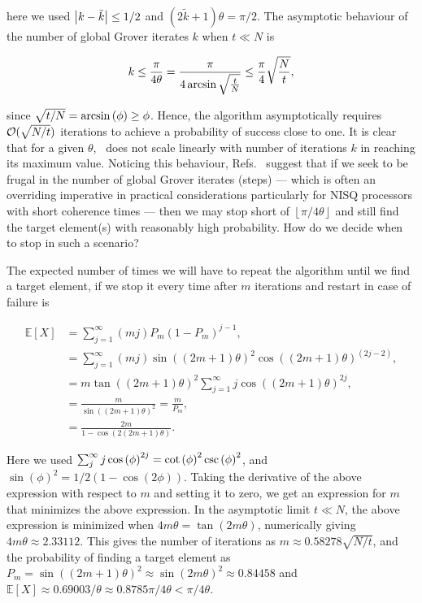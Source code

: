 \noindent
here we used $\abs{k - \tilde{k}} \leq 1/2$ and $(2\tilde{k} + 1)\theta = \pi/2$. The asymptotic behaviour of the number of global Grover iterates $k$ when $t \ll N$ is 

\begin{align}
	k \leq \frac{\pi}{4\theta} = \frac{\pi}{4\arcsine{\sqrt{\frac{t}{N}}}} \leq \frac{\pi}{4}\sqrt{\frac{N}{t}},
\end{align}

\noindent
since $\sqrt{t/N} = \arcsine{(\phi)} \geq \phi$. Hence, the algorithm asymptotically requires $\mathcal{O}(\sqrt{N/t})$ iterations to achieve a probability of success close to one. It is clear that for a given $\theta$,~ does not scale linearly with number of iterations $k$ in reaching its maximum value. Noticing this behaviour, Refs.~\cite{Boyer_1998,Gingrich_2000} suggest that if we seek to be frugal in the number of global Grover iterates (steps) --- which is often an overriding imperative in practical considerations particularly for \acs{NISQ} processors with short coherence times --- then we may stop short of $\left\lfloor \pi/4\theta \right\rfloor$ and still find the target element(s) with reasonably high probability. How do we decide when to stop in such a scenario? 

\clearpage
\noindent
The expected number of times we will have to repeat the algorithm until we find a target element, if we stop it every time after $m$ iterations and restart in case of failure is

\begin{align}
	\mathbb{E}[X] &= \displaystyle\sum_{j=1}^{\infty}(m j) P_m(1 - P_m)^{j-1},  \nonumber \\
					  &= \displaystyle\sum_{j=1}^{\infty} (m j) \sin{((2m + 1)\theta)}^2 \cos{((2m + 1)\theta)}^{(2j - 2)}, \nonumber \\
					  &= m\tan{((2m+1)\theta)}^2 \displaystyle\sum_{j=1}^{\infty}j\cos{((2m+1)\theta)}^{2j}, \\
					  &= \frac{m}{\sin{((2m+1)\theta)}^2} = \frac{m}{P_m}, \nonumber \\
					  &= \frac{2m}{1 - \cos{(2(2m + 1)\theta)}}.
\end{align}

\noindent
Here we used $\sum_{j}^{\infty} j\cos{(\phi)}^{2j} = \cot{(\phi)}^2 \cosecant{(\phi)}^2$, and $ \sin{(\phi)}^2 = 1/2(1 - \cos{(2\phi)})$. Taking the derivative of the above expression with respect to $m$ and setting it to zero, we get an expression for $m$ that minimizes the above expression. In the asymptotic limit $t \ll N$, the above expression is minimized when $4m\theta = \tan{(2 m\theta)}$, numerically giving $4 m\theta \approx  2.33112$. This gives the number of iterations as $m \approx 0.58278 \sqrt{N/t}$, and the probability of finding a target element as $P_m = \sin{((2m+1)\theta)}^2 \approx \sin{(2m\theta)}^2 \approx 0.84458$ and $\mathbb{E}[X] \approx 0.69003/\theta \approx 0.8785 \pi/4\theta < \pi/4\theta$.

